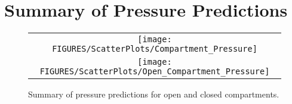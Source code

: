 \clearpage

\section{Summary of Pressure Predictions}


\begin{figure}[h!]
\begin{center}
\begin{tabular}{c}
\texttt{[image: FIGURES/ScatterPlots/Compartment\_Pressure]} \\
\texttt{[image: FIGURES/ScatterPlots/Open\_Compartment\_Pressure]}
\end{tabular}
\end{center}
\caption[Summary of pressure predictions]{Summary of pressure predictions for open and closed compartments.}
\label{Pressure_Summary}
\end{figure}

